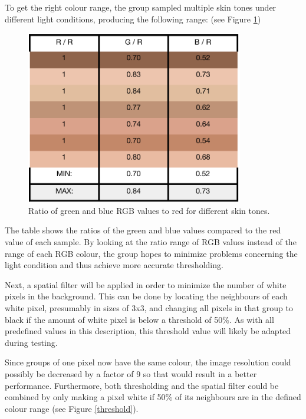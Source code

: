 To get the right colour range, the group sampled multiple skin tones under different light conditions, producing the following range: (see Figure \ref{colorrange})

\begin{figure}[H]
\centering
\includegraphics[scale=1]{colorrange}
\caption{Ratio of green and blue RGB values to red for different skin tones.}
\label{colorrange}
\end{figure}

The table shows the ratios of the green and blue values compared to the red value of each sample. By looking at the ratio range of RGB values instead of the range of each RGB colour, the group hopes to minimize problems concerning the light condition and thus achieve more accurate thresholding.

Next, a spatial filter\cite{nguyen2012} will be applied in order to minimize the number of white pixels in the background. This can be done by locating the neighbours of each white pixel, presumably in sizes of 3x3\cite[p.12]{nelson}, and changing all pixels in that group to black if the amount of white pixel is below a threshold of 50\%. As with all predefined values in this description, this threshold value will likely be adapted during testing.

Since groups of one pixel now have the same colour, the image resolution could possibly be decreased by a factor of 9 so that would result in a better performance. Furthermore, both thresholding and the spatial filter could be combined by only making a pixel white if 50\% of its neighbours are in the defined colour range (see Figure \ref{threshold}).


